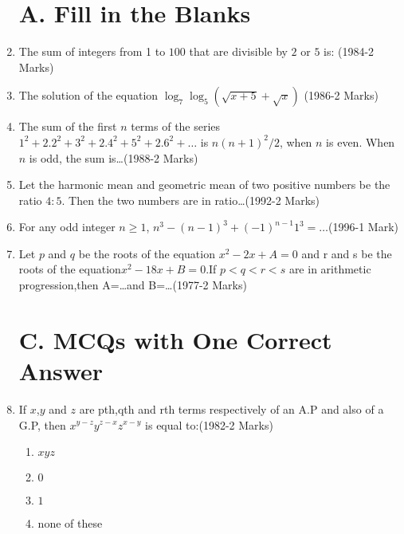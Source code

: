 \documentclass[journal,12pt,onecolumn]{IEEEtran}
\theoremstyle{remark}
\begin{document}
\begin{enumerate}
\section{A. Fill in the Blanks}


	\item  The sum of integers from 1 to $100$ that are divisible by $2$ or $5$ is: \hfill{(1984-2 Marks)}
    
    
	    \item  The solution of the equation                                    
       ${\log_{7}\log_{5}(\sqrt{x+5}+\sqrt{x})}$ \hfill{(1986-2 Marks)}
     
     
	     \item The sum of the first $n$ terms of the series ${1^2+2.2^2+3^2+2.4^2+5^2+2.6^2+\dots}$ is
   ${n (n+1)^2 /2}$, when $n$ is even. When $n$ is odd, the sum 
   is\dots\hfill{(1988-2 Marks)}
        
          
		  \item Let the harmonic mean and geometric mean of two positive numbers be the ratio $4:5$. Then the two numbers are in 
    ratio\dots\hfill{(1992-2 Marks)}
          
     
	     \item For any odd integer $n \ge 1$, ${n^3-(n-1)^3+(-1)^{n-1} 1^3=\dots}$\hfill{(1996-1 Mark)}
       
     
	     \item  Let $p$ and $q$ be the roots of the equation                    ${x^2-2x+A=0}$ and r and s be the roots of the                     equation${x^2-18x+B=0}$.If ${p<q<r<s}$ are                                      in arithmetic progression,then A=\dots and B=\dots\hfill{(1977-2 Marks)}
     
    
    \section{ C. MCQs with One Correct Answer}
        
    
	    \item  If $x$,$y$ and $z$ are pth,qth and rth terms respectively of an A.P and also of a G.P, then ${x^{y-z} y^{z-x} z^{x-y}}$ 
        is equal to:\hfill{(1982-2 Marks)}
\begin{enumerate} 
  \item $xyz$ 
  \item $0$
  \item $1$ 
  \item none of these
  \end{enumerate}


\end{enumerate}
\end{document}
